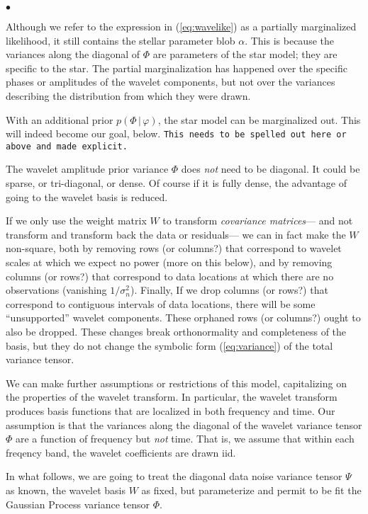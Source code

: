 \documentclass[12pt,letterpaper]{article}
\renewenvironment{itemize}{\begin{list}{$\bullet$}{%
  \setlength{\topsep}{0.0ex}%
  \setlength{\parsep}{0.0ex}%
  \setlength{\partopsep}{0.0ex}%
  \setlength{\itemsep}{0.0ex}%
  \setlength{\leftmargin}{1.5\parindent}}}{\end{list}}
\newcommand{\warning}[1]{\texttt{#1}}
\newcommand{\given}{\,|\,}
\newcommand{\starpars}{\alpha}
\newcommand{\variance}{\sigma^2}
\newcommand{\hyperpars}{\varphi}
\newcommand{\noisetensor}{\Psi}
\newcommand{\wavetensor}{\Phi}
\newcommand{\weightmatrix}{W}
\begin{document}
\begin{itemize}
\item
Although we refer to the expression in (\ref{eq:wavelike}) as
a partially marginalized likelihood, it still contains the stellar parameter blob $\starpars$.
This is because the variances along the diagonal of $\wavetensor$ are parameters of the star model;
they are specific to the star.
The partial marginalization has happened over the specific phases or amplitudes of the wavelet components,
but not over the variances describing the distribution from which they were drawn.
\item
With an additional prior $p(\wavetensor\given\hyperpars)$,
the star model can be marginalized out.
This will indeed become our goal, below.
\warning{This needs to be spelled out here or above and made explicit.}
\item
The wavelet amplitude prior variance $\wavetensor$ does \emph{not} need to be diagonal.
It could be sparse, or tri-diagonal, or dense.
Of course if it is fully dense, the advantage of going to the wavelet basis is reduced.
\item
If we only use the weight matrix $\weightmatrix$ to transform \emph{covariance matrices}---%
and not transform and transform back the data or residuals---%
we can in fact make the $\weightmatrix$ non-square,
both by removing rows (or columns?) that correspond to wavelet scales at which we expect no power
(more on this below),
and by removing columns (or rows?) that correspond to data locations at which there are no observations
(vanishing $1/\variance_n$).
Finally, If we drop columns (or rows?) that correspond to contiguous intervals of data locations,
there will be some ``unsupported'' wavelet components.
These orphaned rows (or columns?) ought to also be dropped.
These changes break orthonormality and completeness of the basis,
but they do not change the symbolic form (\ref{eq:variance}) of the total variance tensor.
\end{itemize}

We can make further assumptions or restrictions of this model,
capitalizing on the properties of the wavelet transform.
In particular, the wavelet transform produces basis functions that are
localized in both frequency and time.
Our assumption is that the variances along the diagonal of the wavelet variance tensor $\wavetensor$
are a function of frequency but \emph{not} time.
That is, we assume that within each freqency band,
the wavelet coefficients are drawn iid.

In what follows,
we are going to treat the diagonal data noise variance tensor $\noisetensor$ as known,
the wavelet basis $\weightmatrix$ as fixed,
but parameterize and permit to be fit the Gaussian Process variance tensor $\wavetensor$.
\end{document}
